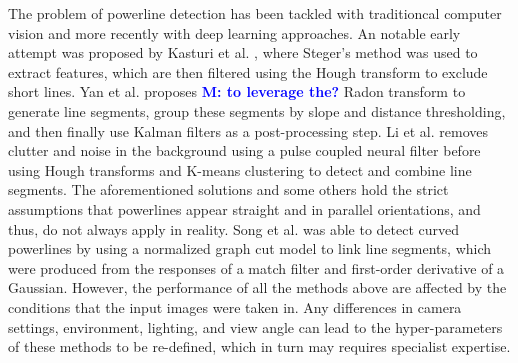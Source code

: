 \documentclass[journal]{IEEEtran}
\newcommand{\commentM}[1]{\textbf{\textcolor{blue}{M: #1}}}
\begin{document}
The problem of powerline detection has been tackled with traditioncal computer vision and more recently with deep learning approaches. An notable early attempt was proposed by Kasturi et al. \cite{related_work_kasturi_2002}, where Steger's method \cite{related_work_steger_1998} was used to extract features, which are then filtered using the Hough transform to exclude short lines. Yan et al. \cite{related_work_guanjian_yan_2007} proposes \commentM{to leverage the?} Radon transform to generate line segments, group these segments by slope and distance thresholding, and then finally use Kalman filters as a post-processing step. Li et al. \cite{related_work_li_zhenrong_2010} removes clutter and noise in the background using a pulse coupled neural filter before using Hough transforms and K-means clustering to detect and combine line segments. The aforementioned solutions and some others \cite{related_work_candamo_2009, related_work_golightly_2005, related_work_zhengrong_li_2008, related_work_boris_alpatov_2016} hold the strict assumptions that powerlines appear straight and in parallel orientations, and thus, do not always apply in reality. Song et al. \cite{related_work_biqin_song_2014} was able to detect curved powerlines by using a normalized graph cut model to link line segments, which were produced from the responses of a match filter and first-order derivative of a Gaussian. However, the performance of all the methods above are affected by the conditions that the input images were taken in. Any differences in camera settings, environment, lighting, and view angle can lead to the hyper-parameters of these methods to be re-defined, which in turn may requires specialist expertise.
\end{document}
